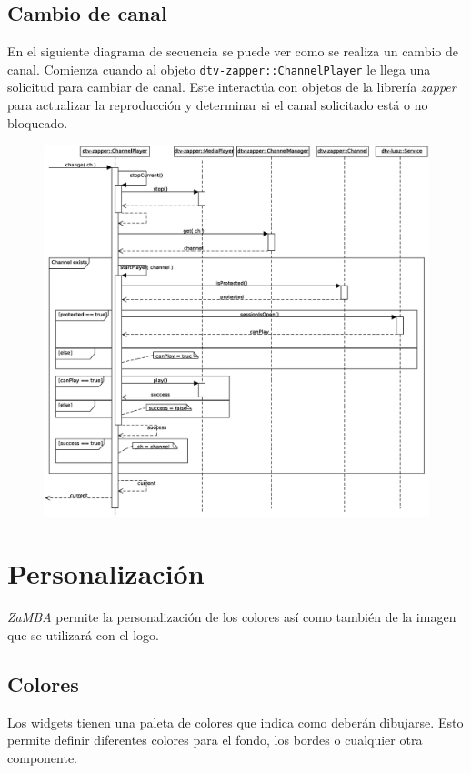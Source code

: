 \subsection{Cambio de canal}
En el siguiente diagrama de secuencia se puede ver como se realiza un cambio de canal. Comienza cuando al objeto \texttt{dtv-zapper::ChannelPlayer}
le llega una solicitud para cambiar de canal. Este interactúa con objetos de la librería \textit{zapper} para actualizar la reproducción y determinar si el 
canal solicitado está o no bloqueado.
\begin{figure}[ht!]
\centering
\includegraphics[scale=0.40]{../resources/uml-sequence-diagram-zapper-change-channel}
\end{figure}

\section{Personalización}
\emph{ZaMBA} permite la personalización de los colores así como también de la imagen que se utilizará con el logo.

\subsection{Colores}
Los widgets tienen una paleta de colores que indica como deberán dibujarse. Esto permite definir diferentes colores para el fondo, los bordes o cualquier otra componente.

